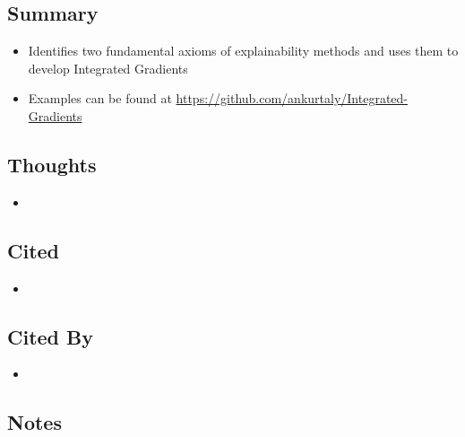 \documentclass{article}
\begin{document}
\subsection*{Summary}
\begin{itemize}
	\item Identifies two fundamental axioms of explainability methods and uses them to develop Integrated Gradients
	\item Examples can be found at \url{https://github.com/ankurtaly/Integrated-Gradients}
\end{itemize}

\subsection*{Thoughts}
\begin{itemize}
	\item
\end{itemize}

\subsection*{Cited}
\begin{itemize}
	\item
\end{itemize}

\subsection*{Cited By}
\begin{itemize}
	\item
\end{itemize}

\subsection*{Notes}
\end{document}
